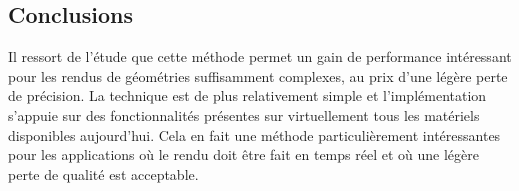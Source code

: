 \subsection{Conclusions}
Il ressort de l'étude que cette méthode permet un gain de performance intéressant pour les rendus de géométries suffisamment
complexes, au prix d'une légère perte de précision. La technique est de plus relativement simple et l'implémentation
s'appuie sur des fonctionnalités présentes sur virtuellement tous les matériels disponibles aujourd'hui. Cela en fait une
méthode particulièrement intéressantes pour les applications où le rendu doit être fait en temps réel et où une légère perte
de qualité est acceptable.
